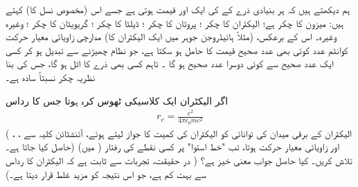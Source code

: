  ہم دیکھتے ہیں کہ ہر بنیادی ذرے کے  کی ایک  اور  قیمت ہوتی ہے جسے اس (مخصوص نسل کا)   کہتے ہیں:   میزون  کا چکر  ہے؛  الیکٹران کا چکر ؛  پروٹان کا چکر ؛  ڈیلٹا کا چکر ؛  گریویٹان کا چکر ؛  وغیرہ وغیرہ۔ اس کے برعکس، (مثلاً   ہائیڈروجن جوہر میں ایک الیکٹران کا) مدارچی زاویائی معیار حرکت کوانٹم عدد  کوئی بھی عدد صحیح قیمت  کا حامل ہو  سکتا ہے، جو نظام چھیڑنے سے تبدیل ہو کر کسی ایک  عدد  صحیح سے کوئی  دوسرا عدد صحیح  ہو گا ۔ تاہم کسی بھی ذرے کا  اٹل ہو گا،  جس کی بنا نظریہ چکر نسبتاً  سادہ ہے۔ 

اگر الیکٹران ایک کلاسیکی ٹھوس کرہ ہوتا جس کا رداس 
\begin{align}
r_c = \frac{e^2}{4 \pi \epsilon_0 m c ^2}
\end{align}
(  الیکٹران کے برقی میدان کی توانائی کو الیکٹران کی کمیت کا جواز لیتے ہوئے،  آئنشٹائن کلیہ   سے   ، ،   حاصل کیا جاتا ہے۔) اور    زاویائی معیار حرکت  ہوتا، تب "خط    استوا"    پر کسی 
نقطے کی رفتار (  میں)  تلاش کریں۔ کیا حاصل جواب معنی خیز ہے؟  ( در حقیقت،  تجربات سے ثابت  ہے کہ الیکٹران کا رداس  سے بہت کم ہے،  جو اس نتیجہ کو  مزید غلط قرار   دیتا ہے۔) 


